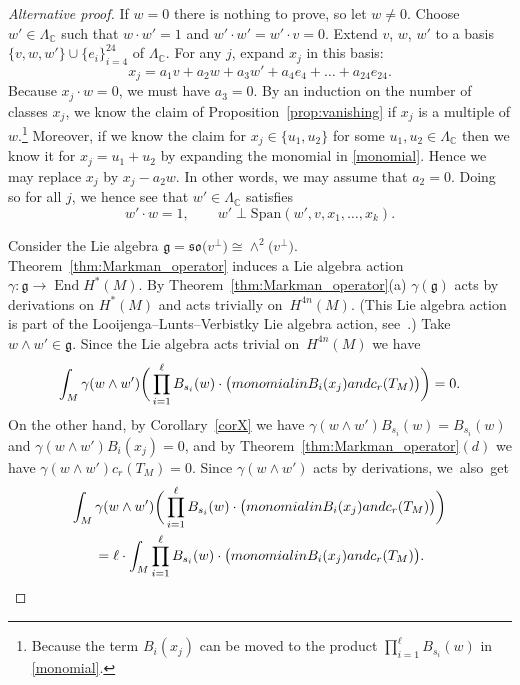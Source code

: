 \documentclass[11pt]{article}
\numberwithin{equation}{section}
\numberwithin{equation}{section}
\newcommand{\BC}{{\mathbb{C}}}
\newcommand{\Fg}{{\mathfrak{g}}}
\newcommand\End{\operatorname{End}}
\newcommand{\1}{\mathsf{1}}
\begin{document}
\begin{proof}[Alternative proof]
If $w=0$ there is nothing to prove, so let $w \neq 0$.
Choose $w' \in \Lambda_{\BC}$ such that $w \cdot w'=1$ and $w' \cdot w' = w' \cdot v = 0$.
Extend $v$, $w$, $w'$ to a basis $\{ v, w, w' \} \cup \{ e_i \}_{i=4}^{24}$ of $\Lambda_{\BC}$.
For any $j$, expand $x_j$ in this basis:
\[
x_j = a_1 v + a_2 w + a_3 w' + a_4 e_4 + \dots + a_{24} e_{24}.
\]
Because $x_j \cdot w=0$, we must have $a_3=0$.
By an induction on the number of classes $x_j$,
we know the claim of Proposition~\ref{prop:vanishing} if $x_j$ is a multiple of $w$.\footnote{Because
the term $B_i(x_j)$ can be moved to the product $\prod_{i=1}^{\ell} B_{s_i}(w)$ in \eqref{monomial}.}
Moreover, if we know the claim for $x_j \in \{ u_1, u_2 \}$ for some $u_1, u_2 \in \Lambda_{\BC}$ then we know it for $x_j = u_1 + u_2$
by expanding the monomial in \eqref{monomial}.
Hence we may replace $x_j$ by $x_j - a_2 w$. In other words, we may assume that $a_2=0$.
Doing so for all $j$, we hence see that
$w' \in \Lambda_{\BC}$ satisfies
\[
w' \cdot w = 1, \qquad w' \perp \mathrm{Span}(w', v, x_1, \dots, x_k).
\]

Consider the Lie algebra $\Fg = \mathfrak{so}\big(v^{\perp}\big) \cong \wedge^2 \big(v^{\perp}\big)$.
Theorem~\ref{thm:Markman_operator} induces a Lie algebra action $\gamma \colon \Fg \to \End H^{\ast}(M)$.
By Theorem~\ref{thm:Markman_operator}(a) $\gamma(\Fg)$ acts by derivations on $H^{\ast}(M)$
and acts trivially on~$H^{4n}(M)$.
(This Lie algebra action is part of the Looijenga--Lunts--Verbistky Lie algebra action, see~\cite[Lemma 4.13]{Markman}.)
Take $w \wedge w' \in \Fg$. Since the Lie algebra acts trivial on~$H^{4n}(M)$ we have
\begin{equation*}
\int_{M} \gamma(w \wedge w') \bigg( \prod_{i=1}^{\ell} B_{s_i}(w) \cdot \big( \textup{monomial in } B_i(x_j) \textup{ and } c_r(T_M) \big) \bigg) = 0.
\end{equation*}
On the other hand, by Corollary~\ref{corX} we have
$\gamma(w \wedge w') B_{s_i}(w) = B_{s_i}(w)$ and $\gamma(w \wedge w') B_i(x_j) = 0$,
and by Theorem~\ref{thm:Markman_operator}$(d)$ we have $\gamma(w \wedge w') c_r(T_{M}) = 0$.
Since $\gamma(w \wedge w')$ acts by derivations, we~also~get\pagebreak
\begin{gather*}
\int_{M} \gamma(w \wedge w') \bigg( \prod_{i=1}^{\ell} B_{s_i}(w) \cdot \big( \textup{monomial in } B_i(x_j) \textup{ and } c_r(T_M) \big) \bigg)
\\ \qquad
{}= \ell \cdot \int_{M} \prod_{i=1}^{\ell} B_{s_i}(w) \cdot \big( \textup{monomial in } B_i(x_j) \textup{ and } c_r(T_M) \big). \tag*{\qed}
\end{gather*}
\renewcommand{\qed}{}
\end{proof}
\end{document}
